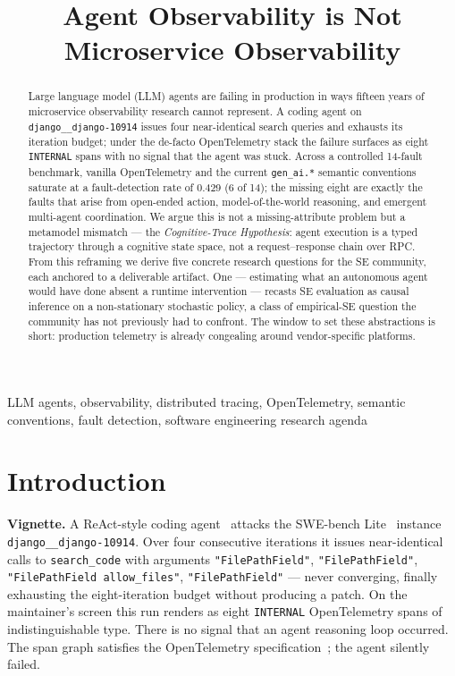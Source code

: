 \documentclass[10pt,conference]{IEEEtran}
\title{Agent Observability is Not Microservice Observability}
\author{\IEEEauthorblockN{Anonymous Author(s)}
\IEEEauthorblockA{Submission anonymized for double-blind review}}
\begin{document}
\maketitle

\begin{abstract}
Large language model (LLM) agents are failing in production in ways
fifteen years of microservice observability research cannot represent.
A coding agent on \texttt{django\_\_django-10914} issues four
near-identical search queries and exhausts its iteration budget; under
the de-facto OpenTelemetry stack the failure surfaces as eight
\texttt{INTERNAL} spans with no signal that the agent was stuck. Across
a controlled 14-fault benchmark, vanilla OpenTelemetry and the current
\texttt{gen\_ai.*} semantic conventions saturate at a fault-detection
rate of 0.429 (6 of 14); the missing eight are exactly the faults that
arise from open-ended action, model-of-the-world reasoning, and
emergent multi-agent coordination. We argue this is not a
missing-attribute problem but a metamodel mismatch --- the
\emph{Cognitive-Trace Hypothesis}: agent execution is a typed
trajectory through a cognitive state space, not a request--response
chain over RPC. From this reframing we derive five concrete research
questions for the SE community, each anchored to a deliverable
artifact. One --- estimating what an autonomous agent would have done
absent a runtime intervention --- recasts SE evaluation as causal
inference on a non-stationary stochastic policy, a class of
empirical-SE question the community has not previously had to confront.
The window to set these abstractions is short: production telemetry is
already congealing around vendor-specific platforms.
\end{abstract}

\begin{IEEEkeywords}
LLM agents, observability, distributed tracing, OpenTelemetry, semantic
conventions, fault detection, software engineering research agenda
\end{IEEEkeywords}

\section{Introduction}

\textbf{Vignette.}
A ReAct-style coding agent~\cite{react} attacks the SWE-bench
Lite~\cite{swebench} instance \texttt{django\_\_django-10914}. Over four
consecutive iterations it issues near-identical calls to
\texttt{search\_code} with arguments
\texttt{"FilePathField"}, \texttt{"FilePathField"},
\texttt{"FilePathField allow\_files"}, \texttt{"FilePathField"} ---
never converging, finally exhausting the eight-iteration budget
without producing a patch. On the maintainer's screen this run
renders as eight \texttt{INTERNAL} OpenTelemetry spans of
indistinguishable type. There is no signal that an agent reasoning
loop occurred. The span graph satisfies the OpenTelemetry
specification~\cite{otel_spec}; the agent silently failed.
\end{document}

